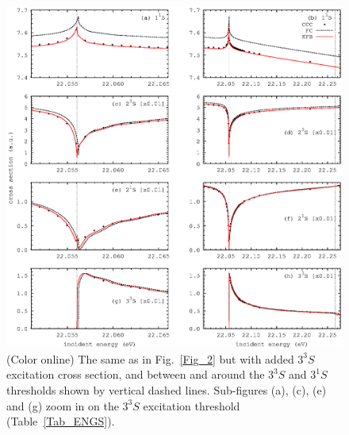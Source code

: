 \documentclass[aip
, pra
, showpacs
, aps
, twocolumn
, groupedaddress
, floatfix
]{revtex4}
\begin{document}
\begin{figure}[htb]
\includegraphics[scale=1]{fig3.ps}
\caption{(Color online)
The same as in Fig.~\ref{Fig_2} but with added $3^3S$ excitation cross section, and 
between and around the $3^3S$ and $3^1S$ thresholds shown by vertical dashed lines.
Sub-figures (a), (c), (e) and (g) zoom in on the $3^3S$ excitation threshold (Table~\ref{Tab_ENGS}).
}
\label{Fig_3}
\end{figure}
\end{document}
